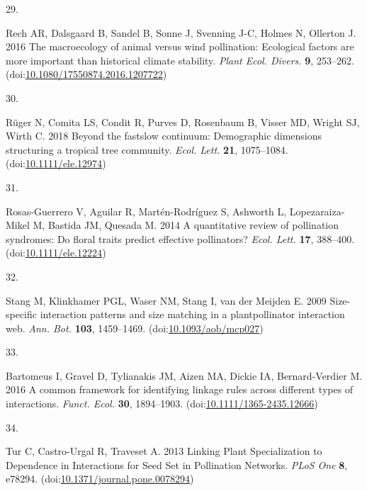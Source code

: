 \documentclass[
  12pt,
  a4paper,
]{article}
\newlength{\cslhangindent}
\newlength{\csllabelwidth}
\newlength{\cslentryspacingunit} %
\newenvironment{CSLReferences}[2] %
 {%
  \setlength{\parindent}{0pt}
  \ifodd #1
  \let\oldpar\par
  \def\par{\hangindent=\cslhangindent\oldpar}
  \fi
  \setlength{\parskip}{#2\cslentryspacingunit}
 }%
 {}
\newcommand{\CSLLeftMargin}[1]{\parbox[t]{\csllabelwidth}{#1}}
\newcommand{\CSLRightInline}[1]{\parbox[t]{\linewidth - \csllabelwidth}{#1}\break}
\begin{document}
\begin{CSLReferences}{0}{0}
\leavevmode{}%
\CSLLeftMargin{29. }
\CSLRightInline{Rech AR, Dalsgaard B, Sandel B, Sonne J, Svenning J-C, Holmes N, Ollerton J. 2016 The macroecology of animal versus wind pollination: Ecological factors are more important than historical climate stability. \emph{Plant Ecol. Divers.} \textbf{9}, 253--262. (doi:\href{https://doi.org/10.1080/17550874.2016.1207722}{10.1080/17550874.2016.1207722})}

\leavevmode{}%
\CSLLeftMargin{30. }
\CSLRightInline{Rüger N, Comita LS, Condit R, Purves D, Rosenbaum B, Visser MD, Wright SJ, Wirth C. 2018 Beyond the fast\textendash slow continuum: Demographic dimensions structuring a tropical tree community. \emph{Ecol. Lett.} \textbf{21}, 1075--1084. (doi:\href{https://doi.org/10.1111/ele.12974}{10.1111/ele.12974})}

\leavevmode{}%
\CSLLeftMargin{31. }
\CSLRightInline{Rosas-Guerrero V, Aguilar R, Martén-Rodríguez S, Ashworth L, Lopezaraiza-Mikel M, Bastida JM, Quesada M. 2014 A quantitative review of pollination syndromes: Do floral traits predict effective pollinators? \emph{Ecol. Lett.} \textbf{17}, 388--400. (doi:\href{https://doi.org/10.1111/ele.12224}{10.1111/ele.12224})}

\leavevmode{}%
\CSLLeftMargin{32. }
\CSLRightInline{Stang M, Klinkhamer PGL, Waser NM, Stang I, van der Meijden E. 2009 Size-specific interaction patterns and size matching in a plant\textendash pollinator interaction web. \emph{Ann. Bot.} \textbf{103}, 1459--1469. (doi:\href{https://doi.org/10.1093/aob/mcp027}{10.1093/aob/mcp027})}

\leavevmode{}%
\CSLLeftMargin{33. }
\CSLRightInline{Bartomeus I, Gravel D, Tylianakis JM, Aizen MA, Dickie IA, Bernard-Verdier M. 2016 A common framework for identifying linkage rules across different types of interactions. \emph{Funct. Ecol.} \textbf{30}, 1894--1903. (doi:\href{https://doi.org/10.1111/1365-2435.12666}{10.1111/1365-2435.12666})}

\leavevmode{}%
\CSLLeftMargin{34. }
\CSLRightInline{Tur C, Castro-Urgal R, Traveset A. 2013 Linking {Plant Specialization} to {Dependence} in {Interactions} for {Seed Set} in {Pollination Networks}. \emph{PLoS One} \textbf{8}, e78294. (doi:\href{https://doi.org/10.1371/journal.pone.0078294}{10.1371/journal.pone.0078294})}


\end{CSLReferences}
\end{document}
